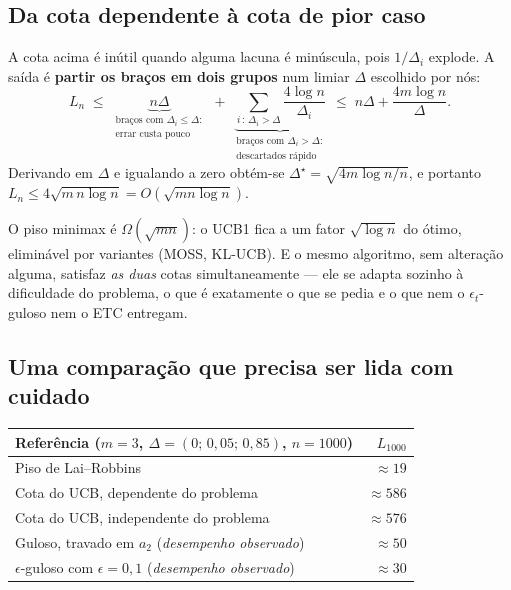 \documentclass[11pt, a4paper]{article}
\newcommand{\gap}{\Delta}
\newcommand{\Reg}{L}
\begin{document}
\subsection*{Da cota dependente à cota de pior caso}

A cota acima é inútil quando alguma lacuna é minúscula, pois $1/\gap_i$
explode. A saída é \textbf{partir os braços em dois grupos} num limiar
$\gap$ escolhido por nós:
\[
  \Reg_n \;\le\;
  \underbrace{n\gap}_{\substack{\text{braços com }\gap_i \le \gap:\\ \text{errar custa pouco}}}
  \;+\;
  \underbrace{\sum_{i\,:\,\gap_i > \gap}\frac{4\log n}{\gap_i}}_{\substack{\text{braços com }\gap_i > \gap:\\ \text{descartados rápido}}}
  \;\le\; n\gap + \frac{4m\log n}{\gap}.
\]
Derivando em $\gap$ e igualando a zero obtém-se
$\gap^{\star} = \sqrt{4m\log n/n}$, e portanto
$\Reg_n \le 4\sqrt{m\,n\log n} = O(\sqrt{mn\log n})$.

\begin{ideiabox}
O piso minimax é $\Omega(\sqrt{mn})$: o UCB1 fica a um fator $\sqrt{\log n}$
do ótimo, eliminável por variantes (MOSS, KL-UCB). E o mesmo algoritmo, sem
alteração alguma, satisfaz \emph{as duas} cotas simultaneamente — ele se
adapta sozinho à dificuldade do problema, o que é exatamente o que se pedia
e o que nem o $\epsilon_t$-guloso nem o ETC entregam.
\end{ideiabox}

\subsection*{Uma comparação que precisa ser lida com cuidado}

\begin{center}
\begin{tabular}{lr}
\toprule
\textbf{Referência} ($m = 3$, $\gap = (0;\,0{,}05;\,0{,}85)$, $n = 1000$)
  & $\Reg_{1000}$ \\
\midrule
Piso de Lai--Robbins & $\approx 19$ \\
Cota do UCB, dependente do problema & $\approx 586$ \\
Cota do UCB, independente do problema & $\approx 576$ \\
Guloso, travado em $a_2$ (\emph{desempenho observado}) & $\approx 50$ \\
$\epsilon$-guloso com $\epsilon = 0{,}1$ (\emph{desempenho observado}) & $\approx 30$ \\
\bottomrule
\end{tabular}
\end{center}
\end{document}
